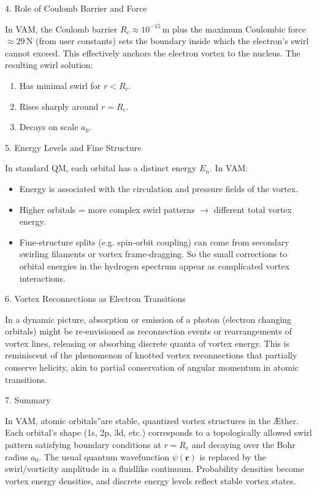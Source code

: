 \documentclass[a4paper,10pt]{article}
\begin{document}
4. Role of Coulomb Barrier and Force

In VAM, the Coulomb barrier \(R_c \approx 10^{-15}\,\mathrm{m}\) plus the maximum Coulombic force \(\approx 29\,\mathrm{N}\) (from user constants) sets the boundary inside which the electron's swirl cannot exceed. This effectively anchors the electron vortex to the nucleus. The resulting swirl solution:

\begin{enumerate}
\item Has minimal swirl for \(r < R_c\).
\item Rises sharply around \(r = R_c\).
\item Decays on scale \(a_0\).
\end{enumerate}

5. Energy Levels and Fine Structure

In standard QM, each orbital has a distinct energy \(E_n\). In VAM:

\begin{itemize}
\item Energy is associated with the circulation and pressure fields of the vortex.
\item Higher orbitals = more complex swirl patterns \(\rightarrow\) different total vortex energy.
\item Fine‐structure splits (e.g. spin‐orbit coupling) can come from secondary swirling filaments or vortex frame‐dragging. So the small corrections to orbital energies in the hydrogen spectrum appear as complicated vortex interactions.
\end{itemize}

6. Vortex Reconnections as Electron Transitions

In a dynamic picture, absorption or emission of a photon (electron changing orbitals) might be re‐envisioned as reconnection events or rearrangements of vortex lines, releasing or absorbing discrete quanta of vortex energy. This is reminiscent of the phenomenon of knotted vortex reconnections that partially conserve helicity, akin to partial conservation of angular momentum in atomic transitions.

7. Summary

In VAM, \grqq atomic orbitals\textquotedblright are stable, quantized vortex structures in the Æther. Each orbital's shape (1s, 2p, 3d, etc.) corresponds to a topologically allowed swirl pattern satisfying boundary conditions at \(r = R_c\) and decaying over the Bohr radius \(a_0\). The usual quantum wavefunction \(\psi(\mathbf{r})\) is replaced by the swirl/vorticity amplitude in a fluidlike continuum. Probability densities become vortex energy densities, and discrete energy levels reflect stable vortex states.
\end{document}
